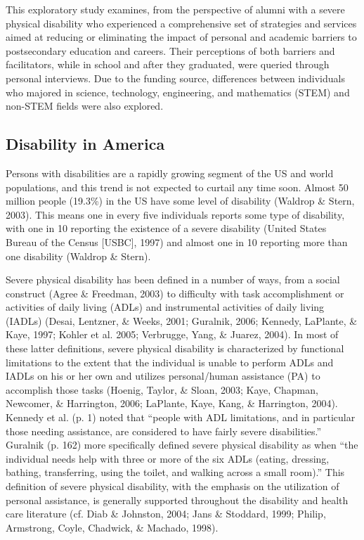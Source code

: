 \documentclass[11.5pt]{sig-alternate} %
\begin{document}
\begin{large}
This exploratory study examines, from the perspective of alumni with a severe physical disability who experienced a comprehensive set of strategies and services aimed at reducing or eliminating the impact of personal and academic barriers to postsecondary education and careers. Their perceptions of both barriers and facilitators, while in school and after they graduated, were queried through personal interviews. Due to the funding source, differences between individuals who majored in science, technology, engineering, and mathematics (STEM) and non-STEM fields were also explored.

\subsection*{Disability in America}
Persons with disabilities are a rapidly growing segment of the US and world populations, and this trend is not expected to curtail any time soon. Almost 50 million people (19.3\%) in the US have some level of disability (Waldrop \& Stern, 2003). This means one in every five individuals reports some type of disability, with one in 10 reporting the existence of a severe disability (United States Bureau of the Census [USBC], 1997) and almost one in 10 reporting more than one disability (Waldrop \& Stern). 

Severe physical disability has been defined in a number of ways, from a social construct (Agree \& Freedman, 2003) to difficulty with task accomplishment or activities of daily living (ADLs) and instrumental activities of daily living (IADLs) (Desai, Lentzner, \& Weeks, 2001; Guralnik, 2006; Kennedy, LaPlante, \& Kaye, 1997; Kohler et al. 2005; Verbrugge, Yang, \& Juarez, 2004). In most of these latter definitions, severe physical disability is characterized by functional limitations to the extent that the individual is unable to perform ADLs and IADLs on his or her own and utilizes personal/human assistance (PA) to accomplish those tasks (Hoenig, Taylor, \& Sloan, 2003; Kaye, 
Chapman, Newcomer, \& Harrington, 2006; LaPlante, Kaye, Kang, \& Harrington, 2004). Kennedy et al. (p. 1) noted that “people with ADL limitations, and in particular those needing assistance, are considered to have fairly severe disabilities.” Guralnik (p. 162) more specifically defined severe physical disability as when “the individual needs help with three or more of the six ADLs (eating, dressing, bathing, transferring, using the toilet, and walking across a small room).” This definition of severe physical disability, with the emphasis on the utilization of personal assistance, is generally supported throughout the disability and health care literature (cf. Diab \& Johnston, 2004; Jans \& Stoddard, 1999; Philip, Armstrong, Coyle, Chadwick, \& Machado, 1998).


\end{large}
\end{document}
